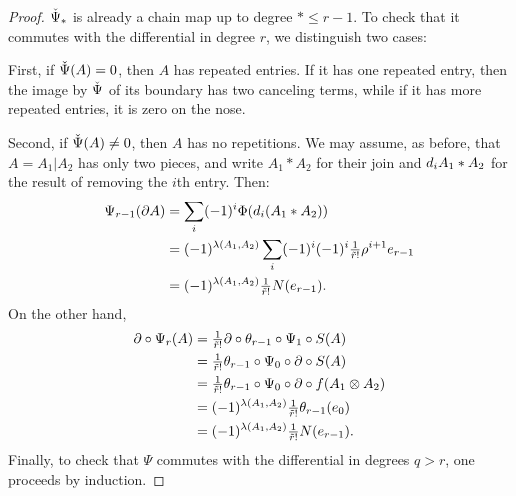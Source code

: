 \begin{proof}
	$\operatorname{\check{\Psi}}_*$ is already a chain map up to degree $*\leq r-1$. To check that it commutes with the differential in degree $r$, we distinguish two cases:

	First, if $\operatorname{\check{\Psi}}(A) = 0$, then $A$ has repeated entries. If it has one repeated entry, then the image by $\operatorname{\check{\Psi}}$ of its boundary has two canceling terms, while if it has more repeated entries, it is zero on the nose.

	Second, if $\operatorname{\check{\Psi}}(A)\neq 0$, then $A$ has no repetitions. We may assume, as before, that $A = A_1|A_2$ has only two pieces, and write $A_1*A_2$ for their join and $d_iA_1*A_2$ for the result of removing the $i$th entry. Then:
	\begin{align*}
		\Psi_{r-1}(\partial A)
		&= \sum_i (-1)^i \Phi(d_i(A_1*A_2))
		\\
		&= (-1)^{\lambda(A_1,A_2)}\sum_i (-1)^i(-1)^{i}{\textstyle\frac{1}{\tilde{r}!}}\rho^{i+1} e_{r-1}
		\\
		&= (-1)^{\lambda(A_1,A_2)} {\textstyle\frac{1}{\tilde{r}!}} N(e_{r-1}).
	\end{align*}
	On the other hand,
	\begin{align*}
		\partial \circ \Psi_r(A) &= {\textstyle\frac{1}{\tilde{r}!}}\partial \circ \theta_{r-1}\circ \Psi_1\circ S(A)
		\\
		&= {\textstyle\frac{1}{\tilde{r}!}}\theta_{r-1}\circ \Psi_0\circ \partial\circ S(A)
		\\
		&= {\textstyle\frac{1}{\tilde{r}!}}\theta_{r-1}\circ \Psi_0\circ \partial\circ f(A_1 \otimes  A_2)
		\\
		&= (-1)^{\lambda(A_1,A_2)}{\textstyle\frac{1}{\tilde{r}!}} \theta_{r-1}(e_0)
		\\
		&= (-1)^{\lambda(A_1,A_2)}{\textstyle\frac{1}{\tilde{r}!}} N(e_{r-1}).
	\end{align*}
	Finally, to check that $\Psi$ commutes with the differential in degrees $q>r$, one proceeds by induction.
\end{proof}

